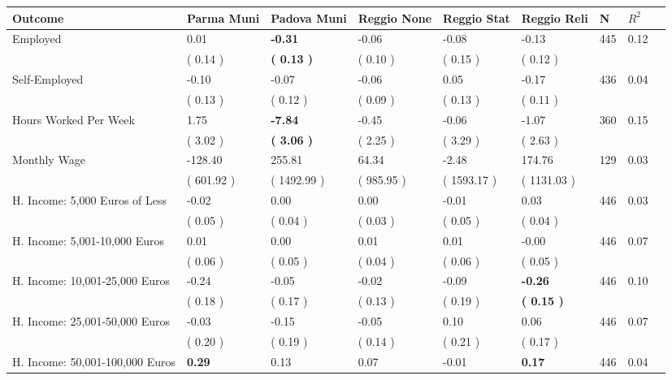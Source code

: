 \begin{tabular}{L{6.2cm} C{1.8cm} C{1.8cm} C{1.8cm} C{1.8cm} C{1.8cm} C{1.8cm} C{0.3cm} C{0.3cm}}
\toprule
 \textbf{Outcome} & \textbf{Parma Muni} & \textbf{Padova Muni} & \textbf{Reggio None} & \textbf{Reggio Stat} & \textbf{Reggio Reli} & \textbf{N} & \textbf{$ R^2$} \\
\midrule
Employed &      0.01 & \textbf{    -0.31} &     -0.06 &     -0.08 &     -0.13  & 445 &       0.12 \\ 
 & (     0.14 ) & \textbf{(     0.13 )} & (     0.10 ) & (     0.15 ) & (     0.12 )  & \\
Self-Employed &     -0.10 &     -0.07 &     -0.06 &      0.05 &     -0.17  & 436 &       0.04 \\ 
 & (     0.13 ) & (     0.12 ) & (     0.09 ) & (     0.13 ) & (     0.11 )  & \\
Hours Worked Per Week &      1.75 & \textbf{    -7.84} &     -0.45 &     -0.06 &     -1.07  & 360 &       0.15 \\ 
 & (     3.02 ) & \textbf{(     3.06 )} & (     2.25 ) & (     3.29 ) & (     2.63 )  & \\
Monthly Wage &   -128.40 &    255.81 &     64.34 &     -2.48 &    174.76  & 129 &       0.03 \\ 
 & (   601.92 ) & (  1492.99 ) & (   985.95 ) & (  1593.17 ) & (  1131.03 )  & \\
H. Income: 5,000 Euros of Less &     -0.02 &      0.00 &      0.00 &     -0.01 &      0.03  & 446 &       0.03 \\ 
 & (     0.05 ) & (     0.04 ) & (     0.03 ) & (     0.05 ) & (     0.04 )  & \\
H. Income: 5,001-10,000 Euros &      0.01 &      0.00 &      0.01 &      0.01 &     -0.00  & 446 &       0.07 \\ 
 & (     0.06 ) & (     0.05 ) & (     0.04 ) & (     0.06 ) & (     0.05 )  & \\
H. Income: 10,001-25,000 Euros &     -0.24 &     -0.05 &     -0.02 &     -0.09 & \textbf{    -0.26}  & 446 &       0.10 \\ 
 & (     0.18 ) & (     0.17 ) & (     0.13 ) & (     0.19 ) & \textbf{(     0.15 )}  & \\
H. Income: 25,001-50,000 Euros &     -0.03 &     -0.15 &     -0.05 &      0.10 &      0.06  & 446 &       0.07 \\ 
 & (     0.20 ) & (     0.19 ) & (     0.14 ) & (     0.21 ) & (     0.17 )  & \\
H. Income: 50,001-100,000 Euros & \textbf{     0.29} &      0.13 &      0.07 &     -0.01 & \textbf{     0.17}  & 446 &       0.04 \\ 

\end{tabular}
